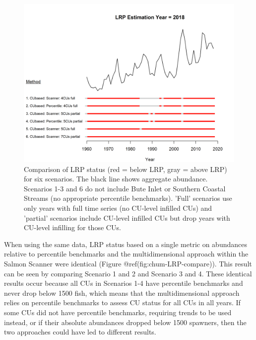 \documentclass[
]{article}
\begin{document}
\begin{figure}

{\centering \includegraphics[width=33.33in]{figure/chum-compare-LRP-methods} 

}

\caption{Comparison of LRP status (red = below LRP, gray = above LRP) for six scenarios. The black line shows aggregate abundance. Scenarios 1-3 and 6 do not include Bute Inlet or Southern Coastal Streams (no appropriate percentile benchmarks). 'Full' scenarios use only years with full time series (no CU-level infilled CUs) and 'partial' scenarios include CU-level infilled CUs but drop years with CU-level infilling for those CUs.}\label{fig:chum-LRP-compare}
\end{figure}
\linebreak

When using the same data, LRP status based on a single metric on
abundances relative to percentile benchmarks and the multidimensional
approach within the Salmon Scanner were identical (Figure
@ref(fig:chum-LRP-compare)). This result can be seen by comparing
Scenario 1 and 2 and Scenario 3 and 4. These identical results occur
because all CUs in Scenarios 1-4 have percentile benchmarks and never
drop below 1500 fish, which means that the multidimensional approach
relies on percentile benchmarks to assess CU status for all CUs in all
years. If some CUs did not have percentile benchmarks, requiring trends
to be used instead, or if their absolute abundances dropped below 1500
spawners, then the two approaches could have led to different results.
\end{document}
